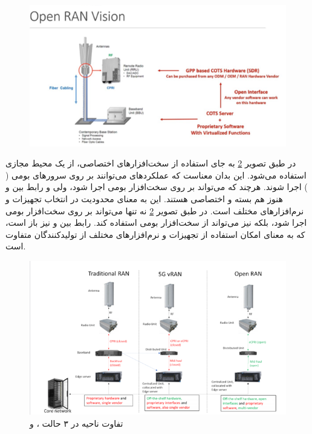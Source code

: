 \documentclass[landscape, 12pt]{report}
\begin{document}
\begin{figure}[ht]
	\centering
	\includegraphics[width=.6\linewidth]{Pic/Open_RAN_Vision}
	\caption{}
	\label{fig:Open_RAN_Vision}
\end{figure}

در
  طبق 
 تصویر \ref{fig:RAN_Area} به جای استفاده از سخت‌افزارهای اختصاصی، از یک محیط مجازی استفاده می‌شود. این بدان معناست که عملکردهای
   می‌توانند بر روی سرورهای بومی (
   ) اجرا شوند. هرچند که
     می‌تواند بر روی سخت‌افزار بومی اجرا شود، ولی
       و رابط بین
         و
           هنوز هم بسته و اختصاصی هستند. این به معنای محدودیت در انتخاب تجهیزات و نرم‌افزارهای مختلف است.
در
  طبق تصویر \ref{fig:RAN_Area} نه تنها
    می‌تواند بر روی سخت‌افزار بومی اجرا شود، بلکه
      نیز می‌تواند از سخت‌افزار بومی استفاده کند. رابط بین
        و
          نیز باز است، که به معنای امکان استفاده از تجهیزات و نرم‌افزارهای مختلف از تولیدکنندگان متفاوت است.



\begin{figure}[ht]
	\centering
	\includegraphics[width=.6\linewidth]{Pic/RAN_Area}
	\caption{تفاوت ناحیه 
		  در ۳ حالت
		   ،
		      و
		        }
	\label{fig:RAN_Area}
\end{figure}
\end{document}
